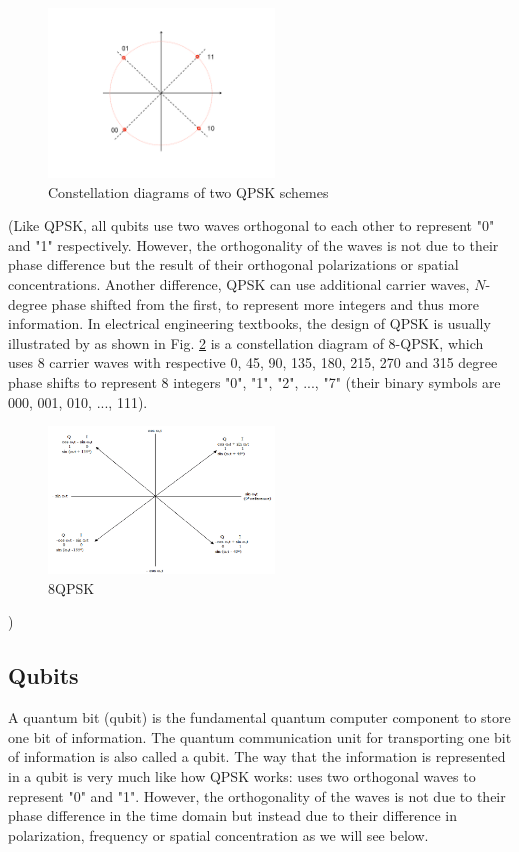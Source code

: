 \documentclass{book}
\begin{document}
\begin{figure}[ht]
\includegraphics[width=6cm]{pic/qpsk.pdf}
\caption{Constellation diagrams of two QPSK schemes}
\label{QPSK}
\end{figure}

(Like QPSK, all qubits use two waves orthogonal to each other to represent "0" and "1" respectively. However, the orthogonality of the waves is not due to their phase difference but the result of their orthogonal polarizations or spatial concentrations. Another difference, QPSK can use additional carrier waves, $N$-degree phase shifted from the first, to represent more integers and thus more information. In electrical engineering textbooks, the design of QPSK is usually illustrated by as shown in Fig. \ref{8QPSK} is a constellation diagram of 8-QPSK, which uses 8 carrier waves with respective 0, 45, 90, 135, 180, 215, 270 and 315 degree phase shifts to represent 8 integers "0", "1", "2", ..., "7" (their binary symbols are 000, 001, 010, ..., 111).
\begin{figure}[ht]
\includegraphics[width=6cm]{pic/8QPSK.png}
\caption{8QPSK}
\label{8QPSK}
\end{figure}
)

\subsection{Qubits}
A quantum bit (qubit) is the fundamental quantum computer component to store one bit of information. The quantum communication unit for transporting one bit of information is also called a qubit. The way that the information is represented in a qubit is very much like how QPSK works: uses two orthogonal waves to represent "0" and "1". However, the orthogonality of the waves is not due to their phase difference in the time domain but instead due to their difference in polarization, frequency or spatial concentration as we will see below. 
\end{document}
